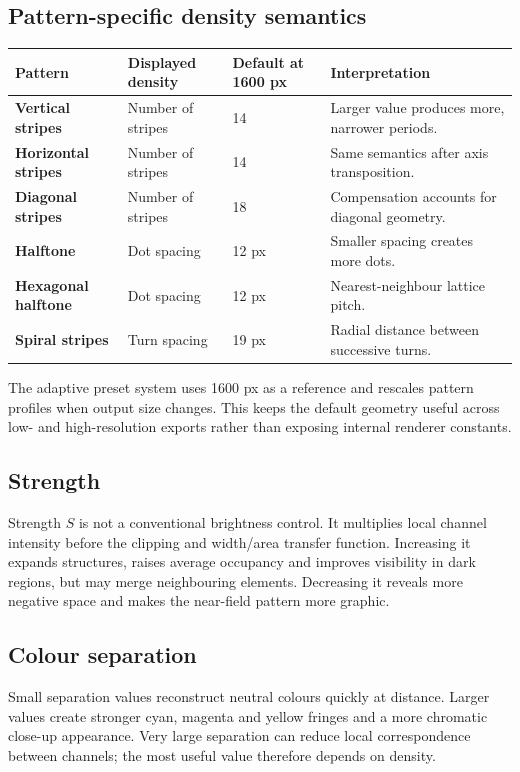 \documentclass[10.5pt,a4paper]{article}
\begin{document}
\subsection{Pattern-specific density semantics}
\begin{tabularx}{\linewidth}{@{}>{\bfseries}p{39mm}p{36mm}p{27mm}X@{}}
\toprule
Pattern & Displayed density & Default at 1600 px & Interpretation \\
\midrule
Vertical stripes & Number of stripes & 14 & Larger value produces more, narrower periods. \\
Horizontal stripes & Number of stripes & 14 & Same semantics after axis transposition. \\
Diagonal stripes & Number of stripes & 18 & Compensation accounts for diagonal geometry. \\
Halftone & Dot spacing & 12 px & Smaller spacing creates more dots. \\
Hexagonal halftone & Dot spacing & 12 px & Nearest-neighbour lattice pitch. \\
Spiral stripes & Turn spacing & 19 px & Radial distance between successive turns. \\
\bottomrule
\end{tabularx}

The adaptive preset system uses 1600 px as a reference and rescales pattern profiles when output size changes. This keeps the default geometry useful across low- and high-resolution exports rather than exposing internal renderer constants.

\subsection{Strength}
Strength $S$ is not a conventional brightness control. It multiplies local channel intensity before the clipping and width/area transfer function. Increasing it expands structures, raises average occupancy and improves visibility in dark regions, but may merge neighbouring elements. Decreasing it reveals more negative space and makes the near-field pattern more graphic.

\subsection{Colour separation}
Small separation values reconstruct neutral colours quickly at distance. Larger values create stronger cyan, magenta and yellow fringes and a more chromatic close-up appearance. Very large separation can reduce local correspondence between channels; the most useful value therefore depends on density.
\end{document}
